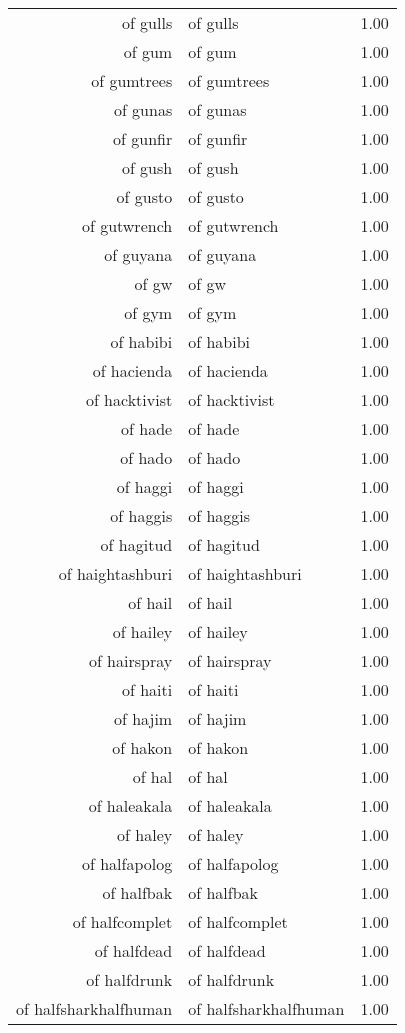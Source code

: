 \begin{table}[ht]
\begin{tabular}{rlr}
  of gulls & of gulls & 1.00 \\ 
  of gum & of gum & 1.00 \\ 
  of gumtrees & of gumtrees & 1.00 \\ 
  of gunas & of gunas & 1.00 \\ 
  of gunfir & of gunfir & 1.00 \\ 
  of gush & of gush & 1.00 \\ 
  of gusto & of gusto & 1.00 \\ 
  of gutwrench & of gutwrench & 1.00 \\ 
  of guyana & of guyana & 1.00 \\ 
  of gw & of gw & 1.00 \\ 
  of gym & of gym & 1.00 \\ 
  of habibi & of habibi & 1.00 \\ 
  of hacienda & of hacienda & 1.00 \\ 
  of hacktivist & of hacktivist & 1.00 \\ 
  of hade & of hade & 1.00 \\ 
  of hado & of hado & 1.00 \\ 
  of haggi & of haggi & 1.00 \\ 
  of haggis & of haggis & 1.00 \\ 
  of hagitud & of hagitud & 1.00 \\ 
  of haightashburi & of haightashburi & 1.00 \\ 
  of hail & of hail & 1.00 \\ 
  of hailey & of hailey & 1.00 \\ 
  of hairspray & of hairspray & 1.00 \\ 
  of haiti & of haiti & 1.00 \\ 
  of hajim & of hajim & 1.00 \\ 
  of hakon & of hakon & 1.00 \\ 
  of hal & of hal & 1.00 \\ 
  of haleakala & of haleakala & 1.00 \\ 
  of haley & of haley & 1.00 \\ 
  of halfapolog & of halfapolog & 1.00 \\ 
  of halfbak & of halfbak & 1.00 \\ 
  of halfcomplet & of halfcomplet & 1.00 \\ 
  of halfdead & of halfdead & 1.00 \\ 
  of halfdrunk & of halfdrunk & 1.00 \\ 
  of halfsharkhalfhuman & of halfsharkhalfhuman & 1.00 \\ 

\end{tabular}
\end{table}
